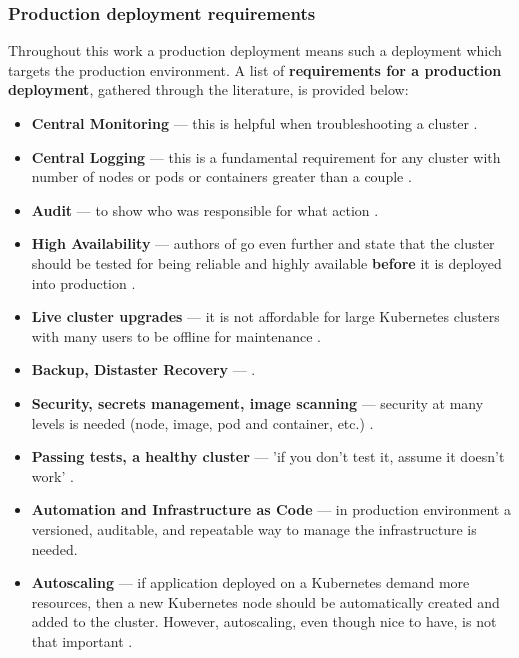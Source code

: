\subsubsection{Production deployment requirements}
\label{Production deployment requirements}
Throughout this work a production deployment means such a deployment which targets the production environment. A list of \textbf{requirements for a production deployment}, gathered through the literature, is provided below:
\begin{itemize}
\item \textbf{Central Monitoring} --- this is helpful when troubleshooting a cluster \cite{book-cndwk, book-mastering-k8s,online-weave-checklists,online-weave-guide}.
\item \textbf{Central Logging} --- this is a fundamental requirement for any cluster with number of nodes or pods or containers greater than a couple \cite{book-mastering-k8s,book-devops-k8s,online-weave-checklists}.
\item \textbf{Audit} --- to show who was responsible for what action \cite{online-weave-guide}.
\item \textbf{High Availability} --- authors of \cite{book-mastering-k8s} go even further and state that the cluster should be tested for being reliable and highly available \textbf{before} it is deployed into production \cite{book-cndwk,book-mastering-k8s}.
\item \textbf{Live cluster upgrades} --- it is not affordable for large Kubernetes clusters with many users to be offline for maintenance \cite{book-mastering-k8s}.
\item \textbf{Backup, Distaster Recovery} --- \cite{book-cndwk,book-mastering-k8s,online-weave-guide}.
\item \textbf{Security, secrets management, image scanning} --- security at many levels is needed (node, image, pod and container, etc.) \cite{book-cndwk,book-mastering-k8s,online-weave-checklists,online-weave-guide}.
\item \textbf{Passing tests, a healthy cluster} --- 'if you don't test it, assume it doesn't work' \cite{book-cndwk,book-mastering-k8s}.
\item \textbf{Automation and Infrastructure as Code} --- in production environment a versioned, auditable, and repeatable way to manage the infrastructure is needed\cite{book-mastering-k8s}\cite{online-weave-guide}.
\item \textbf{Autoscaling} --- if application deployed on a Kubernetes demand more resources, then a new Kubernetes node should be automatically created and added to the cluster. However, autoscaling, even though nice to have, is not that important \cite{book-cndwk}.
\end{itemize}

